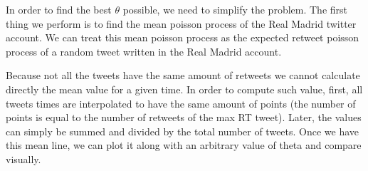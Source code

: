 In order to find the best $\theta$ possible, we need to simplify the problem. 
The first thing we perform is to find the mean poisson process of the Real Madrid twitter account. 
We can treat this mean poisson process as the expected retweet poisson process of a random tweet written in the Real Madrid account.

Because not all the tweets have the same amount of retweets we cannot calculate directly the mean value for a given time. 
In order to compute such value, first, all tweets times are interpolated to have the same amount of points (the number of points is equal to the number of retweets of the max RT tweet). 
Later, the values can simply be summed and divided by the total number of tweets. 
Once we have this mean line, we can plot it along with an arbitrary value of theta and compare visually.

